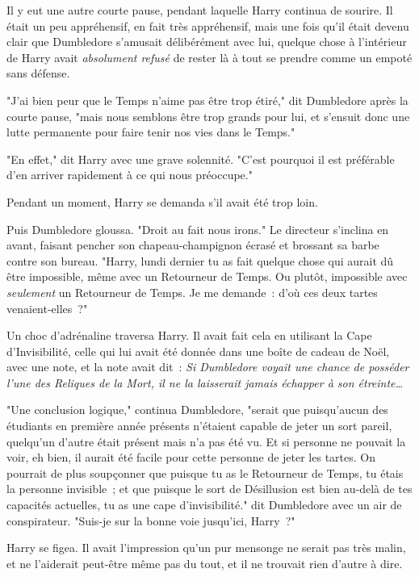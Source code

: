 Il y eut une autre courte pause, pendant laquelle Harry continua de sourire. Il était un peu appréhensif, en fait très appréhensif, mais une fois qu'il était devenu clair que Dumbledore s'amusait délibérément avec lui, quelque chose à l'intérieur de Harry avait \emph{absolument refusé} de rester là à tout se prendre comme un empoté sans défense.

"J'ai bien peur que le Temps n'aime pas être trop étiré," dit Dumbledore après la courte pause, "mais nous semblons être trop grands pour lui, et s'ensuit donc une lutte permanente pour faire tenir nos vies dans le Temps."

"En effet," dit Harry avec une grave solennité. "C'est pourquoi il est préférable d'en arriver rapidement à ce qui nous préoccupe."

Pendant un moment, Harry se demanda s'il avait été trop loin.

Puis Dumbledore gloussa. "Droit au fait nous irons." Le directeur s'inclina en avant, faisant pencher son chapeau-champignon écrasé et brossant sa barbe contre son bureau. "Harry, lundi dernier tu as fait quelque chose qui aurait dû être impossible, même avec un Retourneur de Temps. Ou plutôt, impossible avec \emph{seulement} un Retourneur de Temps. Je me demande~: d'où ces deux tartes venaient-elles~?"

Un choc d'adrénaline traversa Harry. Il avait fait cela en utilisant la Cape d'Invisibilité, celle qui lui avait été donnée dans une boîte de cadeau de Noël, avec une note, et la note avait dit~: \emph{Si Dumbledore voyait une chance de posséder l'une des Reliques de la Mort, il ne la laisserait jamais échapper à son étreinte…}

"Une conclusion logique," continua Dumbledore, "serait que puisqu'aucun des étudiants en première année présents n'étaient capable de jeter un sort pareil, quelqu'un d'autre était présent mais n'a pas été vu. Et si personne ne pouvait la voir, eh bien, il aurait été facile pour cette personne de jeter les tartes. On pourrait de plus soupçonner que puisque tu as le Retourneur de Temps, tu étais la personne invisible~; et que puisque le sort de Désillusion est bien au-delà de tes capacités actuelles, tu as une cape d'invisibilité." dit Dumbledore avec un air de conspirateur. "Suis-je sur la bonne voie jusqu'ici, Harry~?"

Harry se figea. Il avait l'impression qu'un pur mensonge ne serait pas très malin, et ne l'aiderait peut-être même pas du tout, et il ne trouvait rien d'autre à dire.


